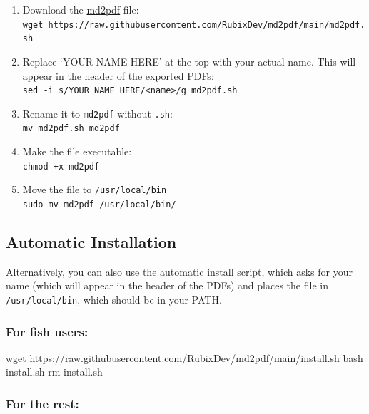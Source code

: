 \documentclass[
]{article}
\newenvironment{Shaded}{}{}
\newcommand{\FunctionTok}[1]{\textcolor[rgb]{0.02,0.16,0.49}{#1}}
\newcommand{\NormalTok}[1]{#1}
\providecommand{\tightlist}{%
  \setlength{\itemsep}{0pt}\setlength{\parskip}{0pt}}
\begin{document}
\begin{enumerate}
\def\labelenumi{\arabic{enumi}.}
\tightlist
\item
  Download the
  \href{https://raw.githubusercontent.com/RubixDev/md2pdf/main/md2pdf.sh}{md2pdf}
  file:\\
  \texttt{wget\ https://raw.githubusercontent.com/RubixDev/md2pdf/main/md2pdf.sh}
\item
  Replace `YOUR NAME HERE' at the top with your actual name. This will
  appear in the header of the exported PDFs:\\
  \texttt{sed\ -i\ \textquotesingle{}s/YOUR\ NAME\ HERE/\textless{}name\textgreater{}/g\textquotesingle{}\ md2pdf.sh}
\item
  Rename it to \texttt{md2pdf} without \texttt{.sh}:\\
  \texttt{mv\ md2pdf.sh\ md2pdf}
\item
  Make the file executable:\\
  \texttt{chmod\ +x\ md2pdf}
\item
  Move the file to \texttt{/usr/local/bin}\\
  \texttt{sudo\ mv\ md2pdf\ /usr/local/bin/}
\end{enumerate}

\hypertarget{automatic-installation}{%
\subsection{Automatic Installation}\label{automatic-installation}}

Alternatively, you can also use the automatic install script, which asks
for your name (which will appear in the header of the PDFs) and places
the file in \texttt{/usr/local/bin}, which should be in your PATH.

\hypertarget{for-fish-users}{%
\subsubsection{For fish users:}\label{for-fish-users}}

\begin{Shaded}
\begin{Highlighting}[]
\FunctionTok{wget}\NormalTok{ https://raw.githubusercontent.com/RubixDev/md2pdf/main/install.sh}
\FunctionTok{bash}\NormalTok{ install.sh}
\FunctionTok{rm}\NormalTok{ install.sh}
\end{Highlighting}
\end{Shaded}

\hypertarget{for-the-rest}{%
\subsubsection{For the rest:}\label{for-the-rest}}
\end{document}
